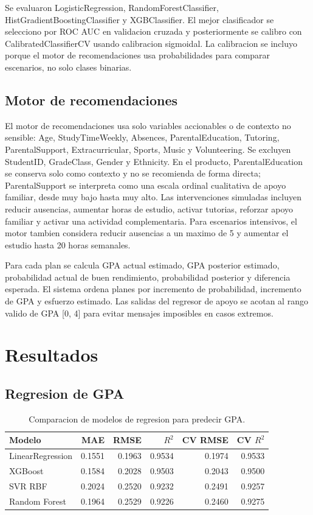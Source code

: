 \documentclass[12pt,onecolumn]{IEEEtran}
\begin{document}
Se evaluaron LogisticRegression, RandomForestClassifier, HistGradientBoostingClassifier y XGBClassifier. El mejor clasificador se selecciono por ROC AUC en validacion cruzada y posteriormente se calibro con CalibratedClassifierCV usando calibracion sigmoidal. La calibracion se incluyo porque el motor de recomendaciones usa probabilidades para comparar escenarios, no solo clases binarias.

\subsection{Motor de recomendaciones}

El motor de recomendaciones usa solo variables accionables o de contexto no sensible: Age, StudyTimeWeekly, Absences, ParentalEducation, Tutoring, ParentalSupport, Extracurricular, Sports, Music y Volunteering. Se excluyen StudentID, GradeClass, Gender y Ethnicity. En el producto, ParentalEducation se conserva solo como contexto y no se recomienda de forma directa; ParentalSupport se interpreta como una escala ordinal cualitativa de apoyo familiar, desde muy bajo hasta muy alto. Las intervenciones simuladas incluyen reducir ausencias, aumentar horas de estudio, activar tutorias, reforzar apoyo familiar y activar una actividad complementaria. Para escenarios intensivos, el motor tambien considera reducir ausencias a un maximo de 5 y aumentar el estudio hasta 20 horas semanales.

Para cada plan se calcula GPA actual estimado, GPA posterior estimado, probabilidad actual de buen rendimiento, probabilidad posterior y diferencia esperada. El sistema ordena planes por incremento de probabilidad, incremento de GPA y esfuerzo estimado. Las salidas del regresor de apoyo se acotan al rango valido de GPA [0, 4] para evitar mensajes imposibles en casos extremos.

\section{Resultados}

\subsection{Regresion de GPA}

\begin{table}[!t]
\centering
\caption{Comparacion de modelos de regresion para predecir GPA.}
\label{tab:regression}
\begin{tabular}{lrrrrr}
\toprule
Modelo & MAE & RMSE & $R^2$ & CV RMSE & CV $R^2$ \\
\midrule
LinearRegression & 0.1551 & 0.1963 & 0.9534 & 0.1974 & 0.9533 \\
XGBoost & 0.1584 & 0.2028 & 0.9503 & 0.2043 & 0.9500 \\
SVR RBF & 0.2024 & 0.2520 & 0.9232 & 0.2491 & 0.9257 \\
Random Forest & 0.1964 & 0.2529 & 0.9226 & 0.2460 & 0.9275 \\
\bottomrule
\end{tabular}
\end{table}
\end{document}
